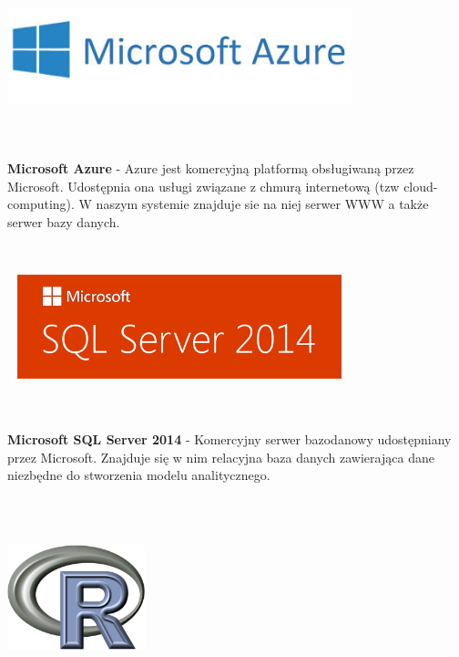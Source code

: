 \documentclass[licencjacka]{pracamgr}
\begin{document}
 \begin{minipage}{\linewidth}
            \centering
            \includegraphics[width=10cm, height = 3cm]{azure.jpg}
\end{minipage} \\ \\
\noindent 
 \textbf{Microsoft Azure} - Azure jest komercyjną platformą obsługiwaną przez Microsoft. Udostępnia ona usługi związane z chmurą internetową (tzw cloud-computing). W naszym systemie znajduje sie na niej serwer WWW a także serwer bazy danych. \par ~\\
\begin{minipage}{\linewidth}
            \centering
            \includegraphics[width=10cm, height = 3cm]{sql-server-2014-logo.png}
\end{minipage} \\ \\

\noindent \textbf{Microsoft SQL Server 2014} - Komercyjny serwer bazodanowy udostępniany przez Microsoft. Znajduje się w nim relacyjna baza danych zawierająca dane niezbędne do stworzenia modelu analitycznego.  \par ~\\

\begin{minipage}{\linewidth}
            \centering
            \includegraphics[width=4cm, height = 4cm]{R.png}
\end{minipage} \\ \\
\end{document}
